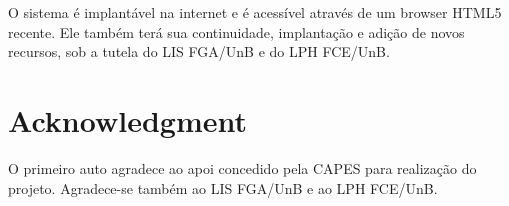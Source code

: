 \documentclass[journal]{IEEEtran}
\begin{document}
O sistema é implantável na internet e é acessível através de um browser HTML5 recente.
Ele também terá sua continuidade, implantação e adição de novos recursos, sob a tutela do LIS FGA/UnB e 
do LPH FCE/UnB.






%





\section*{Acknowledgment}

O primeiro auto agradece ao apoi concedido pela CAPES para realização do projeto.
Agradece-se também ao LIS FGA/UnB e ao LPH FCE/UnB.
\end{document}
